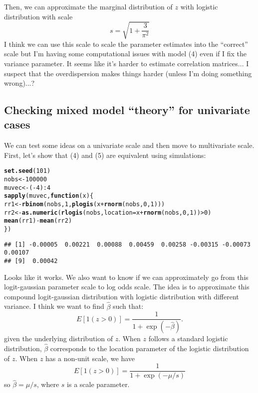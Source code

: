 \documentclass{article}\usepackage[]{graphicx}\usepackage[]{color}
\makeatletter
\newcommand{\hlnum}[1]{\textcolor[rgb]{0.686,0.059,0.569}{#1}}%
\newcommand{\hlopt}[1]{\textcolor[rgb]{0,0,0}{#1}}%
\newcommand{\hlstd}[1]{\textcolor[rgb]{0.345,0.345,0.345}{#1}}%
\newcommand{\hlkwa}[1]{\textcolor[rgb]{0.161,0.373,0.58}{\textbf{#1}}}%
\newcommand{\hlkwb}[1]{\textcolor[rgb]{0.69,0.353,0.396}{#1}}%
\newcommand{\hlkwc}[1]{\textcolor[rgb]{0.333,0.667,0.333}{#1}}%
\newcommand{\hlkwd}[1]{\textcolor[rgb]{0.737,0.353,0.396}{\textbf{#1}}}%
\newenvironment{kframe}{%
 \def\at@end@of@kframe{}%
 \ifinner\ifhmode%
  \def\at@end@of@kframe{\end{minipage}}%
  \begin{minipage}{\columnwidth}%
 \fi\fi%
 \def\FrameCommand##1{\hskip\@totalleftmargin \hskip-\fboxsep
 \colorbox{shadecolor}{##1}\hskip-\fboxsep
     \hskip-\linewidth \hskip-\@totalleftmargin \hskip\columnwidth}%
 \MakeFramed {\advance\hsize-\width
   \@totalleftmargin\z@ \linewidth\hsize
   \@setminipage}}%
 {\par\unskip\endMakeFramed%
 \at@end@of@kframe}
\newenvironment{knitrout}{}{} %
\makeatother
\begin{document}
Then, we can approximate the marginal distribution of $z$ with logistic distribution with scale 
$$
s =  \sqrt{1 + \frac{3}{\pi^2}}
$$
I think we can use this scale to scale the parameter estimates into the ``correct'' scale but I'm having some computational issues with model (4) even if I fix the variance parameter. It seems like it's harder to estimate correlation matrices... I suspect that the overdispersion makes things harder (unless I'm doing something wrong)...?

\subsection{Checking mixed model ``theory'' for univariate cases}

We can test some ideas on a univariate scale and then move to multivariate scale. 
First, let's show that (4) and (5) are equivalent using simulations:

\begin{knitrout}
\color{fgcolor}\begin{kframe}
\begin{alltt}
\hlkwd{set.seed}\hlstd{(}\hlnum{101}\hlstd{)}
\hlstd{nobs} \hlkwb{<-} \hlnum{100000}
\hlstd{muvec} \hlkwb{<-} \hlstd{(}\hlopt{-}\hlnum{4}\hlstd{)}\hlopt{:}\hlnum{4}
\hlkwd{sapply}\hlstd{(muvec,} \hlkwa{function}\hlstd{(}\hlkwc{x}\hlstd{) \{}
        \hlstd{rr1} \hlkwb{<-} \hlkwd{rbinom}\hlstd{(nobs,} \hlnum{1}\hlstd{,} \hlkwd{plogis}\hlstd{(x} \hlopt{+} \hlkwd{rnorm}\hlstd{(nobs,} \hlnum{0}\hlstd{,} \hlnum{1}\hlstd{)))}
        \hlstd{rr2} \hlkwb{<-} \hlkwd{as.numeric}\hlstd{(}\hlkwd{rlogis}\hlstd{(nobs,} \hlkwc{location}\hlstd{=x} \hlopt{+} \hlkwd{rnorm}\hlstd{(nobs,} \hlnum{0}\hlstd{,} \hlnum{1}\hlstd{))} \hlopt{>} \hlnum{0}\hlstd{)}
        \hlkwd{mean}\hlstd{(rr1)} \hlopt{-} \hlkwd{mean}\hlstd{(rr2)}
\hlstd{\})}
\end{alltt}
\begin{verbatim}
## [1] -0.00005  0.00221  0.00088  0.00459  0.00258 -0.00315 -0.00073  0.00107
## [9]  0.00042
\end{verbatim}
\end{kframe}
\end{knitrout}
Looks like it works. We also want to know if we can approximately go from this logit-gaussian parameter scale to log odds scale.
The idea is to approximate this compound logit-gaussian distribution with logistic distribution with different variance. 
I think we want to find $\hat \beta$ such that:
\begin{equation}
E[1 (z > 0)] = \frac{1}{1 + \exp(-\hat \beta)}.
\end{equation}
given the underlying distribution of $z$. When $z$ follows a standard logistic distribution, $\hat \beta$ corresponds to the location parameter of the logistic distribution of $z$.
When $z$ has a non-unit scale, we have
\begin{equation}
E[1 (z > 0)] = \frac{1}{1 + \exp(-\mu/s)}
\end{equation}
so $\hat \beta = \mu/s$, where $s$ is a scale parameter.
\end{document}
